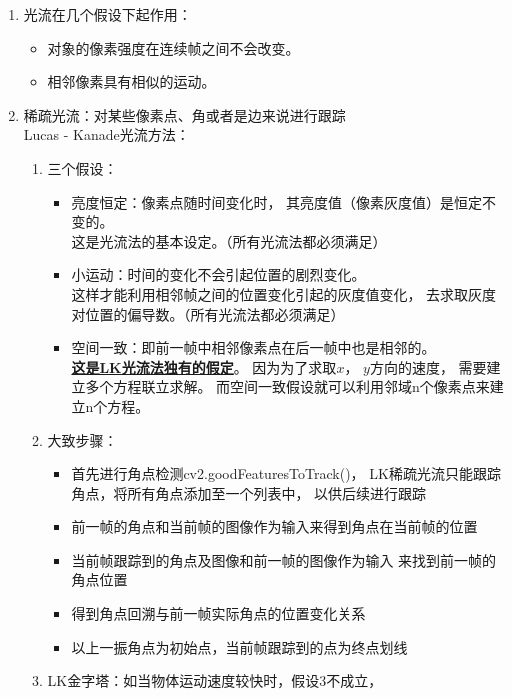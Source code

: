 \documentclass[AutoFakeBold]{MyFormat}
\begin{document}
\begin{enumerate}
    \item 光流在几个假设下起作用：
    \begin{itemize}
        \item 对象的像素强度在连续帧之间不会改变。
        \item 相邻像素具有相似的运动。
    \end{itemize}
    \item 稀疏光流：对某些像素点、角或者是边来说进行跟踪\\
    Lucas - Kanade光流方法：
    \begin{enumerate}
        \item 三个假设：
        \begin{itemize}
            \item 亮度恒定：像素点随时间变化时，
            其亮度值（像素灰度值）是恒定不变的。\\
            这是光流法的基本设定。（所有光流法都必须满足）
            \item 小运动：时间的变化不会引起位置的剧烈变化。\\
            这样才能利用相邻帧之间的位置变化引起的灰度值变化，
            去求取灰度对位置的偏导数。（所有光流法都必须满足）
            \item 空间一致：即前一帧中相邻像素点在后一帧中也是相邻的。\\
            \textbf{\Large \underline{这是LK光流法独有的假定}}。
            因为为了求取$x$， $y$方向的速度，
            需要建立多个方程联立求解。
            而空间一致假设就可以利用邻域n个像素点来建立n个方程。
        \end{itemize}
        \item 大致步骤：
        \begin{itemize}
            \item 首先进行角点检测cv2.goodFeaturesToTrack()，
            LK稀疏光流只能跟踪角点，将所有角点添加至一个列表中，
            以供后续进行跟踪
            \item 前一帧的角点和当前帧的图像作为输入来得到角点在当前帧的位置
            \item 当前帧跟踪到的角点及图像和前一帧的图像作为输入
            来找到前一帧的角点位置
            \item 得到角点回溯与前一帧实际角点的位置变化关系
            \item 以上一振角点为初始点，当前帧跟踪到的点为终点划线
        \end{itemize}
        \item LK金字塔：如当物体运动速度较快时，假设3不成立，

\end{enumerate}
\end{enumerate}
\end{document}

